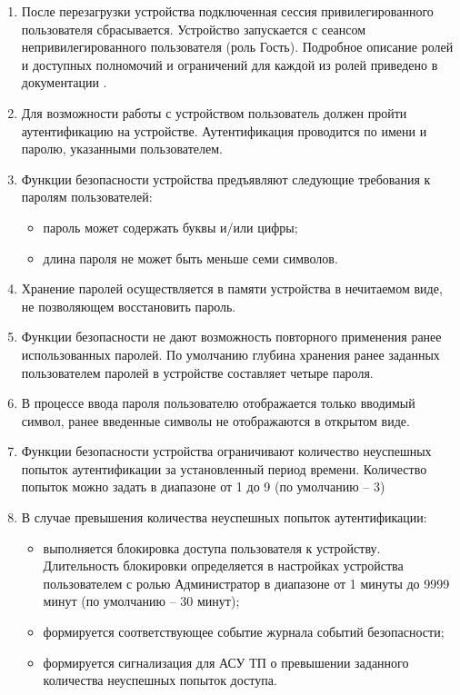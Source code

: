 \begin{enumerate}[label=\arabic{section}.\arabic{subsection}.\arabic*, labelsep=4pt, leftmargin=0pt, itemindent=57pt]
\begin{enumerate}[label=\arabic{section}.\arabic{subsection}.\arabic{enumi}.\arabic*, labelsep=4pt, leftmargin=0em, itemindent=65pt, parsep=0pt]
\item
После перезагрузки устройства подключенная сессия привилегированного пользователя сбрасывается.
Устройство запускается с сеансом непривилегированного пользователя (роль Гость).
Подробное описание ролей и доступных полномочий и ограничений для каждой из ролей приведено в документации \ManualUnitGeneral.

\item
Для возможности работы с устройством пользователь должен пройти аутентификацию на устройстве.
Аутентификация проводится по имени и паролю, указанными пользователем. 

\item
Функции безопасности устройства предъявляют следующие требования к паролям пользователей:
\begin{itemize}
    \item пароль может содержать буквы и/или цифры;
    \item длина пароля не может быть меньше семи символов. 
\end{itemize}

\item
Хранение паролей осуществляется в памяти устройства в нечитаемом виде, не позволяющем восстановить пароль.

\item
Функции безопасности не дают возможность повторного применения ранее использованных паролей.
По умолчанию глубина хранения ранее заданных пользователем паролей в устройстве составляет четыре пароля.

\item
В процессе ввода пароля пользователю отображается только вводимый символ, ранее введенные символы не отображаются в открытом виде.

\item
Функции безопасности устройства ограничивают количество неуспешных попыток аутентификации за установленный период времени.
Количество попыток можно задать в диапазоне от 1 до 9 (по умолчанию – 3)

\item
В случае превышения количества неуспешных попыток аутентификации:
\begin{itemize}
    \item выполняется блокировка доступа пользователя к устройству. Длительность блокировки определяется в настройках устройства пользователем с ролью Администратор в диапазоне от 1 минуты до 9999 минут (по умолчанию – 30 минут);
    \item формируется соответствующее событие журнала событий безопасности;
    \item формируется сигнализация для АСУ ТП о превышении заданного количества неуспешных попыток доступа. 
\end{itemize}


\end{enumerate}
\end{enumerate}
